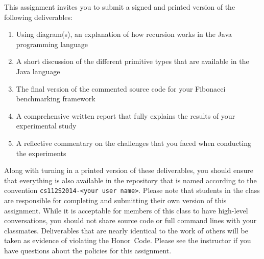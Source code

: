   This assignment invites you to submit a signed and printed version of the following deliverables: 

  \begin{enumerate} 
  \itemsep0pt
  \item Using diagram(s), an explanation of how recursion works in the Java programming language

  \item A short discussion of the different primitive types that are available in the Java language

  \item The final version of the commented source code for your Fibonacci benchmarking framework

  \item A comprehensive written report that fully explains the results of your experimental study

  \item A reflective commentary on the challenges that you faced when conducting the experiments
   
  \end{enumerate}

  Along with turning in a printed version of these deliverables, you should ensure that everything is also available in
  the repository that is named according to the convention {\tt cs112S2014-<your user name>}. Please note that students
  in the class are responsible for completing and submitting their own version of this assignment.    While it is
  acceptable for members of this class to have high-level conversations, you should not share source code or full
  command lines with your classmates.  Deliverables that are nearly identical to the work of others will be taken as
  evidence of violating the \mbox{Honor Code}.  Please see the instructor if you have questions about the policies for
  this assignment.

  
